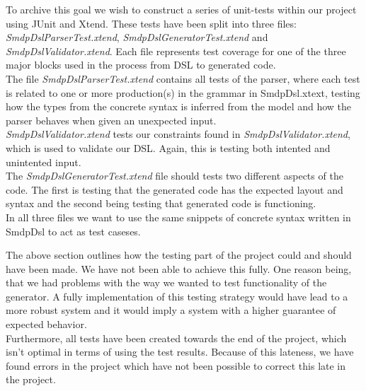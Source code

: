 \documentclass[paper=a4, fontsize=11pt]{scrartcl} %
\numberwithin{equation}{section} %
\numberwithin{figure}{section} %
\numberwithin{table}{section} %
\begin{document}
To archive this goal we wish to construct a series of unit-tests within our project using JUnit and Xtend. These tests have been split into three files: \textit{SmdpDslParserTest.xtend}, \textit{SmdpDslGeneratorTest.xtend} and \textit{SmdpDslValidator.xtend}. Each file represents test coverage for one of the three major blocks used in the process from DSL to generated code.\\
The file \textit{SmdpDslParserTest.xtend} contains all tests of the parser, where each test is related to one or more production(s) in the grammar in SmdpDsl.xtext, testing how the types from the concrete syntax is inferred from the model and how the parser behaves when given an unexpected input.\\ 
\textit{SmdpDslValidator.xtend} tests our constraints found in \textit{SmdpDslValidator.xtend}, which is used to validate our DSL. Again, this is testing both intented and unintented input.\\ 
The \textit{SmdpDslGeneratorTest.xtend} file should tests two different aspects of the code. The first is testing that the generated code has the expected layout and syntax and the second being testing that generated code is functioning. \\
In all three files we want to use the same snippets of concrete syntax written in SmdpDsl to act as test caseses.\newline

The above section outlines how the testing part of the project could and should have been made. We have not been able to achieve this fully. One reason being, that we had problems with the way we wanted to test functionality of the generator. A fully implementation of this testing strategy would have lead to a more robust system and it would imply a system with a higher guarantee of expected behavior. \\
Furthermore, all tests have been created towards the end of the project, which isn't optimal in terms of using the test results. Because of this lateness, we have found errors in the project which have not been possible to correct this late in the project.

\end{document}
